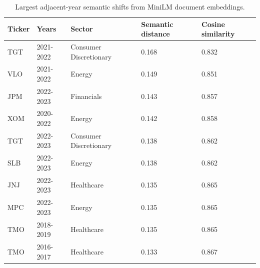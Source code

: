 \begin{table}[htbp]
\centering
\caption{Largest adjacent-year semantic shifts from MiniLM document embeddings.}
\label{tab:enhanced_embedding_shifts}
\begin{tabular}{lllll}
\hline
Ticker & Years & Sector & Semantic distance & Cosine similarity \\
\hline
TGT & 2021-2022 & Consumer Discretionary & 0.168 & 0.832 \\
VLO & 2021-2022 & Energy & 0.149 & 0.851 \\
JPM & 2022-2023 & Financials & 0.143 & 0.857 \\
XOM & 2020-2022 & Energy & 0.142 & 0.858 \\
TGT & 2022-2023 & Consumer Discretionary & 0.138 & 0.862 \\
SLB & 2022-2023 & Energy & 0.138 & 0.862 \\
JNJ & 2022-2023 & Healthcare & 0.135 & 0.865 \\
MPC & 2022-2023 & Energy & 0.135 & 0.865 \\
TMO & 2018-2019 & Healthcare & 0.135 & 0.865 \\
TMO & 2016-2017 & Healthcare & 0.133 & 0.867 \\
\hline
\end{tabular}
\end{table}
